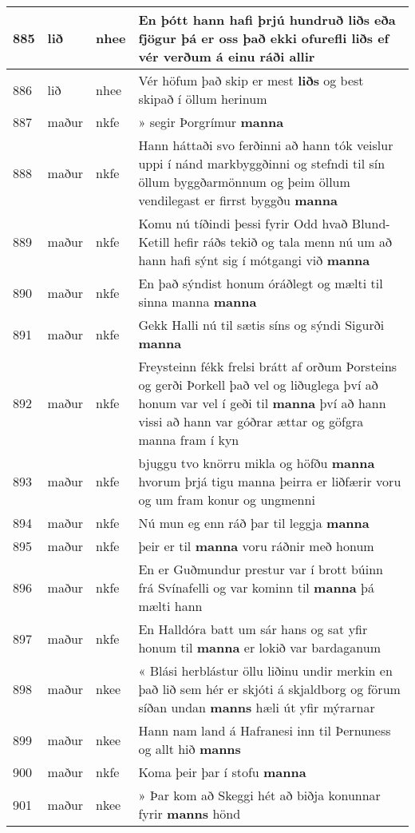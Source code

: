 \documentclass{article}
\begin{document}
\begin{longtable}{p{1cm}|p{1cm}|p{1cm}|p{13cm}}
\hline
885&lið&nhee&En þótt hann hafi þrjú hundruð \textbf{liðs} eða fjögur þá er oss það ekki ofurefli liðs ef vér verðum á einu ráði allir\\
\hline
886&lið&nhee&Vér höfum það skip er mest \textbf{liðs} og best skipað í öllum herinum\\
\hline
887&maður&nkfe&» segir Þorgrímur \textbf{manna} \\
\hline
888&maður&nkfe&Hann háttaði svo ferðinni að hann tók veislur uppi í nánd markbyggðinni og stefndi til sín öllum byggðarmönnum og þeim öllum vendilegast er firrst byggðu \textbf{manna} \\
\hline
889&maður&nkfe&Komu nú tíðindi þessi fyrir Odd hvað Blund-Ketill hefir ráðs tekið og tala menn nú um að hann hafi sýnt sig í mótgangi við \textbf{manna} \\
\hline
890&maður&nkfe&En það sýndist honum óráðlegt og mælti til sinna manna \textbf{manna} \\
\hline
891&maður&nkfe&Gekk Halli nú til sætis síns og sýndi Sigurði \textbf{manna} \\
\hline
892&maður&nkfe&Freysteinn fékk frelsi brátt af orðum Þorsteins og gerði Þorkell það vel og liðuglega því að honum var vel í geði til \textbf{manna} því að hann vissi að hann var góðrar ættar og göfgra manna fram í kyn\\
\hline
893&maður&nkfe&bjuggu tvo knörru mikla og höfðu \textbf{manna} hvorum þrjá tigu manna þeirra er liðfærir voru og um fram konur og ungmenni\\
\hline
894&maður&nkfe&Nú mun eg enn ráð þar til leggja \textbf{manna} \\
\hline
895&maður&nkfe&þeir er til \textbf{manna} voru ráðnir með honum\\
\hline
896&maður&nkfe&En er Guðmundur prestur var í brott búinn frá Svínafelli og var kominn til \textbf{manna} þá mælti hann\\
\hline
897&maður&nkfe&En Halldóra batt um sár hans og sat yfir honum til \textbf{manna} er lokið var bardaganum\\
\hline
898&maður&nkee&« Blási herblástur öllu liðinu undir merkin en það lið sem hér er skjóti á skjaldborg og förum síðan undan \textbf{manns} hæli út yfir mýrarnar\\
\hline
899&maður&nkee&Hann nam land á Hafranesi inn til Þernuness og allt hið \textbf{manns} \\
\hline
900&maður&nkfe&Koma þeir þar í stofu \textbf{manna} \\
\hline
901&maður&nkee&» Þar kom að Skeggi hét að biðja konunnar fyrir \textbf{manns} hönd\\

\end{longtable}
\end{document}
